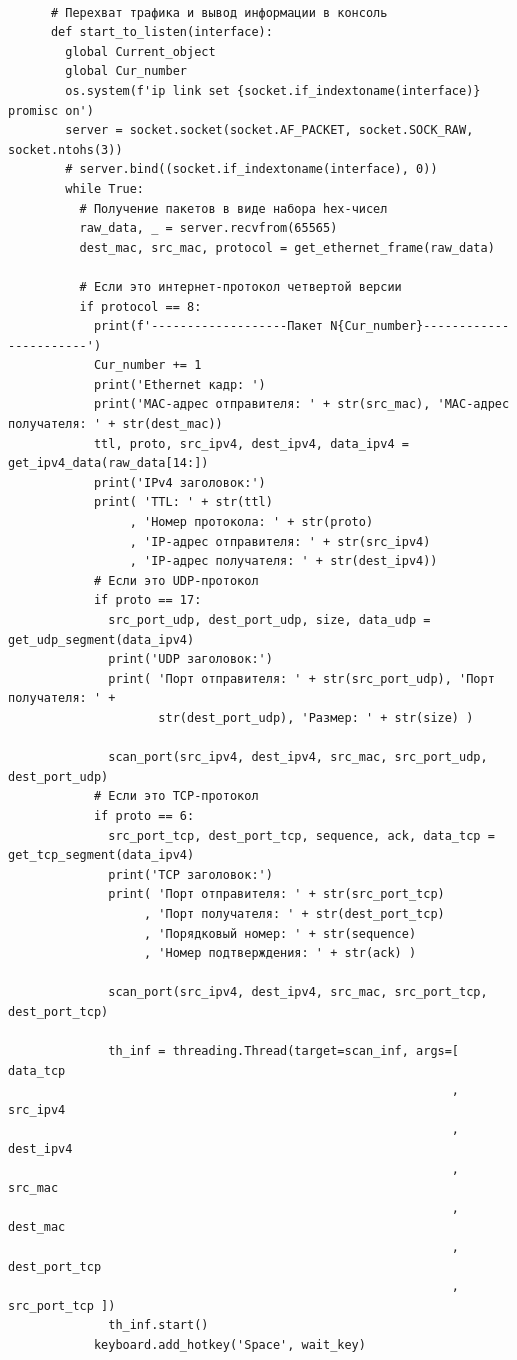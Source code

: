 \documentclass[bachelor, och, coursework]{SCWorks}
\begin{document}
    \begin{verbatim}

      # Перехват трафика и вывод информации в консоль
      def start_to_listen(interface):
        global Current_object
        global Cur_number
        os.system(f'ip link set {socket.if_indextoname(interface)} promisc on')
        server = socket.socket(socket.AF_PACKET, socket.SOCK_RAW, socket.ntohs(3))
        # server.bind((socket.if_indextoname(interface), 0))
        while True:
          # Получение пакетов в виде набора hex-чисел
          raw_data, _ = server.recvfrom(65565)
          dest_mac, src_mac, protocol = get_ethernet_frame(raw_data)
      
          # Если это интернет-протокол четвертой версии    
          if protocol == 8:
            print(f'-------------------Пакет N{Cur_number}-----------------------')
            Cur_number += 1
            print('Ethernet кадр: ')
            print('MAC-адрес отправителя: ' + str(src_mac), 'MAC-адрес получателя: ' + str(dest_mac))
            ttl, proto, src_ipv4, dest_ipv4, data_ipv4 = get_ipv4_data(raw_data[14:])
            print('IPv4 заголовок:')
            print( 'TTL: ' + str(ttl)
                 , 'Номер протокола: ' + str(proto)
                 , 'IP-адрес отправителя: ' + str(src_ipv4)
                 , 'IP-адрес получателя: ' + str(dest_ipv4))
            # Если это UDP-протокол  
            if proto == 17:
              src_port_udp, dest_port_udp, size, data_udp = get_udp_segment(data_ipv4)
              print('UDP заголовок:')
              print( 'Порт отправителя: ' + str(src_port_udp), 'Порт получателя: ' + 
                     str(dest_port_udp), 'Размер: ' + str(size) )
              
              scan_port(src_ipv4, dest_ipv4, src_mac, src_port_udp, dest_port_udp)
            # Если это TCP-протокол  
            if proto == 6:
              src_port_tcp, dest_port_tcp, sequence, ack, data_tcp = get_tcp_segment(data_ipv4)
              print('TCP заголовок:')
              print( 'Порт отправителя: ' + str(src_port_tcp)
                   , 'Порт получателя: ' + str(dest_port_tcp)
                   , 'Порядковый номер: ' + str(sequence)
                   , 'Номер подтверждения: ' + str(ack) )
      
              scan_port(src_ipv4, dest_ipv4, src_mac, src_port_tcp, dest_port_tcp)
              
              th_inf = threading.Thread(target=scan_inf, args=[ data_tcp
                                                              , src_ipv4
                                                              , dest_ipv4
                                                              , src_mac
                                                              , dest_mac
                                                              , dest_port_tcp
                                                              , src_port_tcp ])
              th_inf.start()
            keyboard.add_hotkey('Space', wait_key)
    \end{verbatim}
\end{document}
